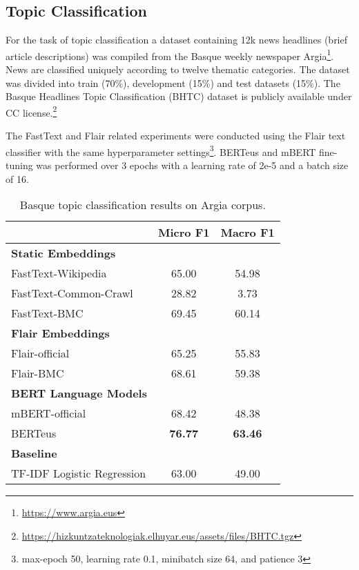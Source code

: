 \documentclass[10pt, a4paper]{article}
\begin{document}
\subsection{Topic Classification}\label{sec:topic}

For the task of topic classification a dataset containing 12k news headlines (brief article descriptions) was compiled from the Basque weekly newspaper Argia\footnote{\scriptsize \url{https://www.argia.eus}}. News are classified uniquely according to twelve thematic categories. The dataset was divided into train (70\%), development (15\%) and test datasets (15\%). The Basque Headlines Topic Classification (BHTC) dataset is publicly available under CC license.\footnote{\scriptsize \url{https://hizkuntzateknologiak.elhuyar.eus/assets/files/BHTC.tgz}}

The FastText and Flair related experiments were conducted using the Flair text classifier with the same hyperparameter settings\footnote{max-epoch 50, learning rate 0.1, minibatch size 64, and  patience 3 }. BERTeus and mBERT fine-tuning was performed over 3 epochs with a learning rate of 2e-5 and a batch size of 16.

\begin{table}[!ht]\small
\centering
\begin{tabular}{@{\hspace{0.3cm}}lcc} \hline
 {\textbf{}} & {\textbf{Micro F1}} &  {\textbf{Macro F1}} \\ \hline
\textbf{Static Embeddings} & & \\
FastText-Wikipedia & 65.00 & 54.98 \\
FastText-Common-Crawl & 28.82 & 3.73  \\
FastText-BMC  & 69.45 & 60.14 \\
\hline%
\textbf{Flair Embeddings}\\
Flair-official & 65.25 & 55.83 \\
Flair-BMC  & 68.61 & 59.38  \\ \hline
\textbf{BERT Language Models}\\
mBERT-official  & 68.42 & 48.38  \\
BERTeus  & \textbf{76.77}	& \textbf{63.46}  \\
\hline
\textbf{Baseline} \\
TF-IDF Logistic Regression & 63.00 & 49.00 \\
\hline
\end{tabular}
\caption{Basque topic classification results on Argia corpus.}\label{tab:topic}
\end{table}
\end{document}
